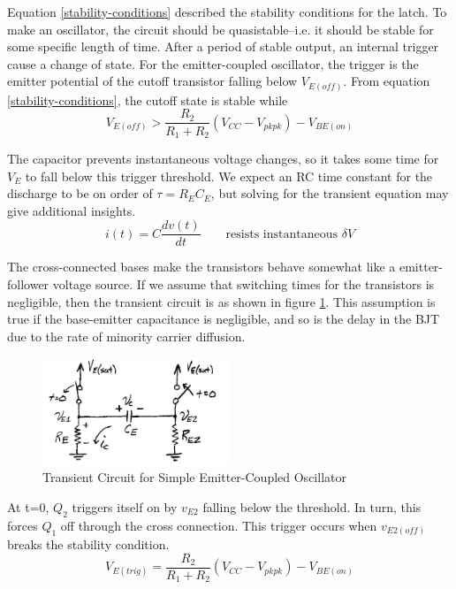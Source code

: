 \documentclass[titlepage, letterpaper, 10.5pt]{article}
\begin{document}
Equation \ref{stability-conditions} described the stability conditions for the latch.
To make an oscillator, the circuit should be quasistable--i.e. it should be stable for some
specific length of time. After a period of stable output, an internal trigger cause a change of state.
For the emitter-coupled oscillator, the trigger is the emitter potential of the cutoff transistor
falling below $V_{E(off)}$. From equation \ref{stability-conditions}, the cutoff state is stable while
\begin{equation*}
V_{E(off)}>\frac{R_{2}}{R_{1}+R_{2}}(V_{CC}-V_{pkpk})-V_{BE(on)}
\end{equation*}

The capacitor prevents instantaneous voltage changes, so it takes some time for $V_{E}$
to fall below this trigger threshold. We expect an RC time constant for the discharge to be on
order of $\tau=R_{E}C_{E}$, but solving for the transient equation may give additional insights.
\begin{equation*}
i(t)=C\frac{dv(t)}{dt} \quad \quad \textrm{resists instantaneous } \delta V
\end{equation*}

The cross-connected bases make the transistors behave somewhat like a emitter-follower voltage source.
If we assume that switching times for the transistors is negligible, then the transient circuit
is as shown in figure \ref{simple-transient-circuit}. This assumption is true if the base-emitter
capacitance is negligible, and so is the delay in the BJT due to the rate of minority carrier diffusion.

\begin{figure}[ht]
	\centering
	\includegraphics[width=0.5\textwidth]{diagrams/simple-transient-circuit}
	\caption{Transient Circuit for Simple Emitter-Coupled Oscillator}
	\label{simple-transient-circuit}
\end{figure}

At t=0, $Q_{2}$ triggers itself on by $v_{E2}$ falling below the threshold.
In turn, this forces $Q_{1}$ off through the cross connection.
This trigger occurs when $v_{E2(off)}$ breaks the stability condition.
\begin{equation}
V_{E(trig)}=\frac{R_{2}}{R_{1}+R_{2}}(V_{CC}-V_{pkpk})-V_{BE(on)}
\end{equation}
\end{document}
